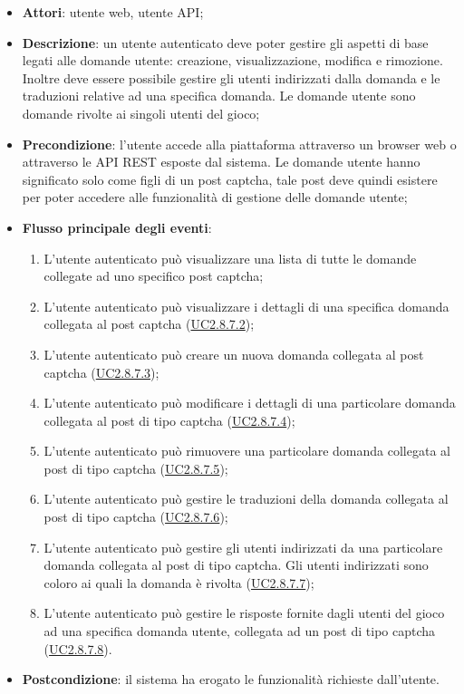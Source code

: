 \begin{itemize}
\item \textbf{Attori}: utente web, utente API;
\item \textbf{Descrizione}: un utente autenticato deve poter gestire gli aspetti di base legati alle domande utente: creazione, visualizzazione, modifica e rimozione.
Inoltre deve essere possibile gestire gli utenti indirizzati dalla domanda e le traduzioni relative ad una specifica domanda.
Le domande utente sono domande rivolte ai singoli utenti del gioco; 
      \item \textbf{Precondizione}: l'utente accede alla piattaforma attraverso un browser web o attraverso le API REST esposte dal sistema. Le domande utente hanno significato solo come figli di un post captcha, tale post deve quindi esistere per poter accedere alle funzionalità di gestione delle domande utente;

        \item \textbf{Flusso principale degli eventi}:
          \begin{enumerate}
          \item L'utente autenticato può visualizzare una lista di tutte le domande collegate ad uno specifico post captcha;
          \item L'utente autenticato può visualizzare i dettagli di una specifica domanda collegata al post captcha (\hyperlink{UC2.8.7.2}{UC2.8.7.2});
          \item L'utente autenticato può creare un nuova domanda collegata al post captcha (\hyperlink{UC2.8.7.3}{UC2.8.7.3});
          \item L'utente autenticato può modificare i dettagli di una particolare domanda collegata al post di tipo captcha (\hyperlink{UC2.8.7.4}{UC2.8.7.4});
          \item L'utente autenticato può rimuovere una particolare domanda collegata al post di tipo captcha (\hyperlink{UC2.8.7.5}{UC2.8.7.5});
          \item L'utente autenticato può gestire le traduzioni della domanda collegata al post di tipo captcha (\hyperlink{UC2.8.7.6}{UC2.8.7.6});
          \item L'utente autenticato può gestire gli utenti indirizzati da una particolare domanda collegata al post di tipo captcha. Gli utenti indirizzati sono coloro ai quali la domanda è rivolta (\hyperlink{UC2.8.7.7}{UC2.8.7.7});
          \item L'utente autenticato può gestire le risposte fornite dagli utenti del gioco ad una specifica domanda utente, collegata ad un post di tipo captcha (\hyperlink{UC2.8.7.8}{UC2.8.7.8}).

      \end{enumerate}
    \item \textbf{Postcondizione}: il sistema ha erogato le funzionalità richieste dall'utente.
  \end{itemize}

